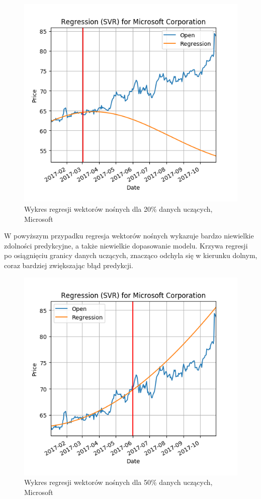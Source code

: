 \begin{figure}[ht]
\centering
\includegraphics[scale=0.4]{pictures/plots/microsoft_svr_20.png}
\caption{Wykres regresji wektorów nośnych dla 20\% danych uczących, Microsoft}
\label{fig:microsoft_svr_20}
\end{figure}

W powyższym przypadku regresja wektorów nośnych wykazuje bardzo niewielkie zdolności predykcyjne, a także niewielkie dopasowanie modelu.
Krzywa regresji po osiągnięciu granicy danych uczących, znacząco odchyla się w kierunku dolnym, coraz bardziej zwiększając błąd predykcji.\\

\begin{figure}[ht]
\centering
\includegraphics[scale=0.4]{pictures/plots/microsoft_svr_50.png}
\caption{Wykres regresji wektorów nośnych dla 50\% danych uczących, Microsoft}
\label{fig:microsoft_svr_50}
\end{figure}

